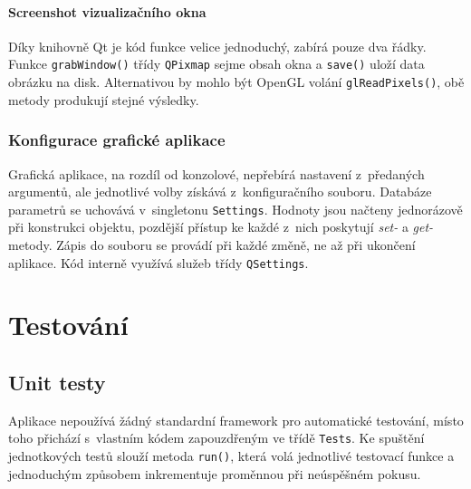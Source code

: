 \documentclass[11pt,twoside,a4paper]{book}
\begin{document}
\subsubsection{Screenshot vizualizačního okna}

Díky knihovně Qt je kód funkce velice jednoduchý, zabírá pouze dva řádky. Funkce \texttt{grab\-Win\-dow()} třídy \texttt{QPixmap} sejme obsah okna a \texttt{save()} uloží data obrázku na disk. Alternativou by mohlo být OpenGL volání \texttt{glReadPixels()}, obě metody produkují stejné výsledky.


\subsection{Konfigurace grafické aplikace}

Grafická aplikace, na rozdíl od konzolové, nepřebírá nastavení z~předaných argumentů, ale jednotlivé volby získává z~konfiguračního souboru. Databáze parametrů se uchovává v~singletonu \texttt{Settings}. Hodnoty jsou načteny jednorázově při konstrukci objektu, pozdější přístup ke každé z~nich poskytují \textit{set-} a \textit{get-} metody. Zápis do souboru se provádí při každé změně, ne až při ukončení aplikace. Kód interně využívá služeb třídy \texttt{QSettings}.




\chapter{Testování}


\section{Unit testy}
\label{unit_testy}

Aplikace nepoužívá žádný standardní framework pro automatické testování, místo toho při\-chá\-zí s~vlastním kódem zapouzdřeným ve třídě \texttt{Tests}. Ke spuštění jednotkových testů slouží metoda \texttt{run()}, která volá jednotlivé testovací funkce a jednoduchým způsobem inkrementuje proměnnou při neúspěšném pokusu.
\end{document}
